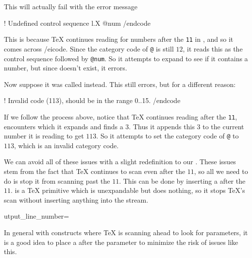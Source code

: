 {{        This will actually fail with the error message

        \begincode
! Undefined control sequence 
l.X \makeatletter\version
                         @num
        /endcode

        This is because \TeX{} continues reading for numbers after the {\tt11} in \hfill\break
        \macroname\makeatletter, and so it comes across \icode\version@num/eicode.
        Since the category code of {\tt @} is still $12$, it reads this as the control sequence \macroname\version{} followed by {\tt @num}.
        So it attempts to expand \macroname\version{} to see if it contains a number, but since \macroname\version{} doesn't exist, it errors.

    \endtextbox

\endslide

\beginslide
    \oheadline

    \textbox\empty{1cm}{2cm}{\hsize-2cm}{}
        Now suppose it was called \macroname\versionname{} instead.
        This still errors, but for a different reason:

        \begincode
! Invalid code (113), should be in the range 0..15.
        /endcode

        If we follow the process above, notice that \TeX{} continues reading after the {\tt11}, encounters \macroname\versionnumber{} which it expands and finds a $3$.
        Thus it appends this $3$ to the current number it is reading to get $113$.
        So it attempts to set the category code of {\tt @} to $113$, which is an invalid category code.

        We can avoid all of these issues with a slight redefinition to our \macroname\makeatletter.
        These issues stem from the fact that \TeX{} continues to scan even after the $11$, so all we need to do is stop it from scanning past the $11$.
        This can be done by inserting a \macroname\relax{} after the $11$.
        \macroname\relax{} is a \TeX{} primitive which is unexpandable but does nothing, so it stops \TeX's scan without inserting anything into the stream.

\let\_output_line_number=\@gobble
\def\syntax@buf{.25cm}
\beginhi
\def\makeatletter{\catcode`@=11\relax}
\endhi

        In general with constructs where \TeX{} is scanning ahead to look for parameters, it is a good idea to place a \macroname\relax{} after the parameter to minimize the risk of issues like this.

}}

